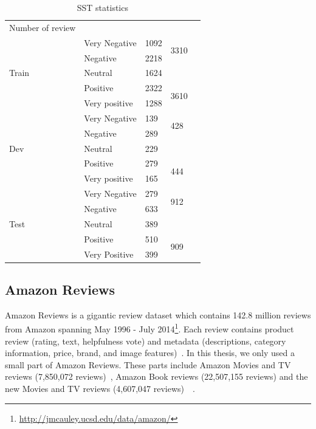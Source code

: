 \begin{table}[H]
    \centering
    \caption{SST statistics}
    \label{table:sststatistic}
    \begin{tabular}{lllll}
        Number of review       &               &      &                       &  \\ \cline{1-4}
        \multirow{5}{*}{Train} & Very Negative & 1092 & \multirow{2}{*}{3310} &  \\ \cline{2-3}
        & Negative      & 2218 &                       &  \\ \cline{2-4}
        & Neutral       & 1624 &                       &  \\ \cline{2-4}
        & Positive      & 2322 & \multirow{2}{*}{3610} &  \\ \cline{2-3}
        & Very positive & 1288 &                       &  \\ \cline{1-4}
        \multirow{5}{*}{Dev}   & Very Negative & 139  & \multirow{2}{*}{428}  &  \\ \cline{2-3}
        & Negative      & 289  &                       &  \\ \cline{2-4}
        & Neutral       & 229  &                       &  \\ \cline{2-4}
        & Positive      & 279  & \multirow{2}{*}{444}  &  \\ \cline{2-3}
        & Very positive & 165  &                       &  \\ \cline{1-4}
        \multirow{5}{*}{Test}  & Very Negative & 279  & \multirow{2}{*}{912}  &  \\ \cline{2-3}
        & Negative      & 633  &                       &  \\ \cline{2-4}
        & Neutral       & 389  &                       &  \\ \cline{2-4}
        & Positive      & 510  & \multirow{2}{*}{909}  &  \\ \cline{2-3}
        & Very Positive & 399  &                       &  \\ \cline{2-4}
    \end{tabular}
\end{table}

\subsection{Amazon Reviews}\label{sec:amazon}
Amazon Reviews is a gigantic review dataset
which contains 142.8 million reviews from Amazon spanning May 1996 - July 2014\footnote{\url{http://jmcauley.ucsd.edu/data/amazon/}}.
Each review contains product review (rating, text, helpfulness vote) and metadata (descriptions, category information, price, brand, and image features)~\cite{amazon-reviews}.
In this thesis, we only used a small part of Amazon Reviews.
These parts include Amazon Movies and TV reviews (7,850,072 reviews)~\cite{mcauley2013hidden}, Amazon Book reviews (22,507,155 reviews) and the new Movies and TV reviews (4,607,047 reviews)~\cite{McAuleyTSH15}~\cite{HeM16}.

